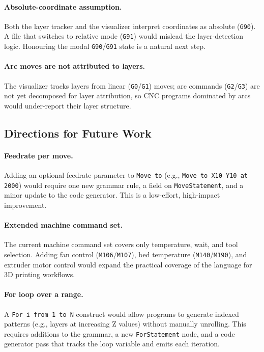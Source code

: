 \paragraph{Absolute-coordinate assumption.}
Both the layer tracker and the visualizer interpret coordinates as absolute (\texttt{G90}). A file that switches to relative mode (\texttt{G91}) would mislead the layer-detection logic. Honouring the modal \texttt{G90}/\texttt{G91} state is a natural next step.

\paragraph{Arc moves are not attributed to layers.}
The visualizer tracks layers from linear (\texttt{G0}/\texttt{G1}) moves; arc commands (\texttt{G2}/\texttt{G3}) are not yet decomposed for layer attribution, so CNC programs dominated by arcs would under-report their layer structure.

\subsection*{Directions for Future Work}

\paragraph{Feedrate per move.}
Adding an optional feedrate parameter to \texttt{Move to} (e.g., \texttt{Move to X10 Y10 at 2000}) would require one new grammar rule, a field on \texttt{MoveStatement}, and a minor update to the code generator. This is a low-effort, high-impact improvement.

\paragraph{Extended machine command set.}
The current machine command set covers only temperature, wait, and tool selection. Adding fan control (\texttt{M106}/\texttt{M107}), bed temperature (\texttt{M140}/\texttt{M190}), and extruder motor control would expand the practical coverage of the language for 3D printing workflows.

\paragraph{For loop over a range.}
A \texttt{For i from 1 to N} construct would allow programs to generate indexed patterns (e.g., layers at increasing Z values) without manually unrolling. This requires additions to the grammar, a new \texttt{ForStatement} node, and a code generator pass that tracks the loop variable and emits each iteration.

